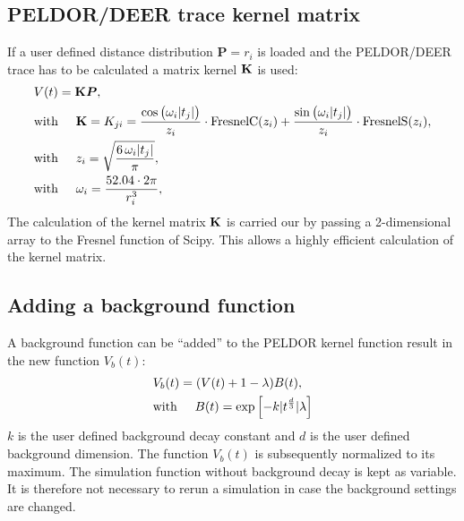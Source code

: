 \documentclass[pdftex,bezier,german,a4,twoside, headexclude,12pt,nochapterprefix, titlepage]{extarticle}
\begin{document}
\subsection{PELDOR/DEER trace kernel matrix}
If a user defined distance distribution $\boldsymbol{P} = r_{i}$ is loaded and the PELDOR/DEER trace has to be calculated a 
matrix kernel $\bold{K}$ is used:
\begin{align}
\begin{split}
&V(t) = \bold{K}\boldsymbol{P},\\
&\mbox{with}\hspace{0.5cm} \bold{K} = K_{ji} =
\frac{\cos{\big(\omega_{i}|t_j| \big)}}{z_{i}} \cdot \text{FresnelC}(z_{i})  + 
   \frac{\sin{\big(\omega_{i} |t_j|\big)}}{z_{i}} \cdot \text{FresnelS}(z_{i}),\\
  &\mbox{with}\hspace{0.5cm}  z_{i} = \sqrt{\frac{6\,\omega_{i} |t_j| }{\pi}},\\
&\mbox{with}\hspace{0.5cm} \omega_{i} = \dfrac{52.04\cdot 2 \pi}{r_{i}^3},\\ 
\label{kernel_matrix_cal}
\end{split}
\end{align}
The calculation of the kernel matrix $\bold{K}$ is carried our by passing a 2-dimensional array to the Fresnel function of Scipy. This allows a highly efficient calculation of the kernel matrix.
\subsection{Adding a background function}
A background function can be ``added'' to the PELDOR kernel function result in the new function $V_{b}(t)$: 
\begin{align}
\begin{split}
&V_{b}(t) = (V(t)+1-\lambda)B(t), \\
&\mbox{with}\hspace{0.5cm}B(t) = \mathrm{exp}\left[-k|t^{\frac{d}{3}}|\lambda \right]
\label{background_function}
\end{split}
\end{align}
$k$ is the user defined background decay constant and $d$ is the user defined background dimension. The 
function $V_{b}(t)$ is subsequently normalized to its maximum.
The simulation function without background decay is kept as variable. It is therefore not necessary to rerun a simulation in 
case the background settings are changed.
\end{document}
